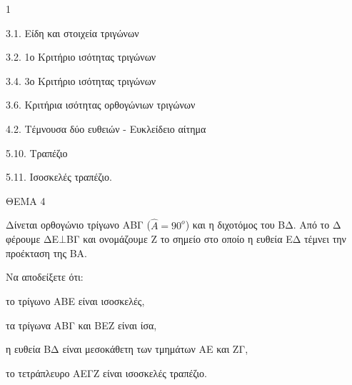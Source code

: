 \begin{ylh}{1}
    \item 3.1. Είδη και στοιχεία τριγώνων
    \item 3.2. 1ο Κριτήριο ισότητας τριγώνων
    \item 3.4. 3ο Κριτήριο ισότητας τριγώνων
    \item 3.6. Κριτήρια ισότητας ορθογώνιων τριγώνων
    \item 4.2. Τέμνουσα δύο ευθειών - Ευκλείδειο αίτημα
    \item 5.10. Τραπέζιο
    \item 5.11. Ισοσκελές τραπέζιο.
\end{ylh}

ΘΕΜΑ 4

Δίνεται ορθογώνιο τρίγωνο ΑΒΓ ($\widehat{Α} = 90^{ο}$) και η διχοτόμος του ΒΔ. Από το Δ φέρουμε ΔΕ$\bot$ΒΓ και ονομάζουμε Ζ το σημείο στο οποίο η ευθεία ΕΔ τέμνει την προέκταση της ΒΑ.

Να αποδείξετε ότι:

\begin{alist}
\item το τρίγωνο ΑΒΕ είναι ισοσκελές, 

\item τα τρίγωνα ΑΒΓ και ΒΕΖ είναι ίσα, 

\item η ευθεία ΒΔ είναι μεσοκάθετη των τμημάτων ΑΕ και ΖΓ, 

\item το τετράπλευρο ΑΕΓΖ είναι ισοσκελές τραπέζιο. 
\end{alist}
